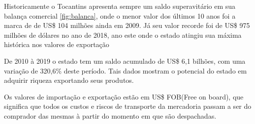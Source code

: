 \par Historicamente o Tocantins apresenta sempre um saldo superavitário em sua balança comercial \ref{fig:balanca}, onde o menor valor dos últimos 10 anos foi a marca de de US\$ 104 milhões ainda em 2009. Já seu valor recorde foi de US\$ 975 milhões de dólares no ano de 2018, ano este onde o estado atingiu sua máxima histórica nos valores de exportação

\par De 2010 à 2019 o estado tem um saldo acumulado de US\$ 6,1 bilhões, com uma variação de 320,6\% deste período. Tais dados mostram o potencial do estado em adquirir riqueza exportando seus produtos. 


\par Os valores de importação e exportação estão em US\$ FOB(Free on board), que significa que todos os custos e riscos de transporte da mercadoria passam a ser do comprador das mesmas à partir do momento em que são despachadas. 